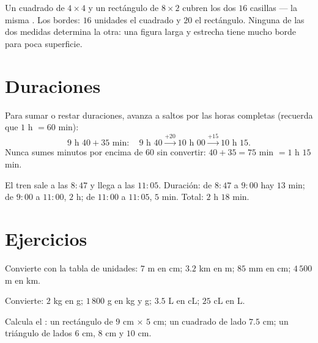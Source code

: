 \begin{example}\label{ex:g4:measure:samearea}
Un cuadrado de $4 \times 4$ y un rectángulo de $8 \times 2$ cubren los dos $16$
casillas --- la misma . Los bordes: $16$ unidades el cuadrado y $20$ el
rectángulo. Ninguna de las dos medidas determina la otra: una figura larga y estrecha
tiene mucho borde para poca superficie.
\end{example}

\section{Duraciones}

\begin{method}\label{met:g4:measure:time}
Para sumar o restar duraciones, avanza a saltos por las horas completas
(recuerda que $1$ h $= 60$ min):
\[
9\text{ h }40 + 35 \text{ min}:
\quad 9\text{ h }40 \xrightarrow{+20} 10\text{ h }00
\xrightarrow{+15} 10\text{ h }15 .
\]
Nunca sumes minutos por encima de $60$ sin convertir: $40 + 35 = 75$ min
$= 1$ h $15$ min.
\end{method}

\begin{example}\label{ex:g4:measure:timetable}
El tren sale a las $8{:}47$ y llega a las $11{:}05$. Duración:
de $8{:}47$ a $9{:}00$ hay $13$ min; de $9{:}00$ a $11{:}00$, $2$ h;
de $11{:}00$ a $11{:}05$, $5$ min. Total: $2$ h $18$ min.
\end{example}

\section{Ejercicios}

\begin{exercise}[$\star$]\label{exo:g4:measure:1}
Convierte con la tabla de unidades: $7$ m en cm; $3.2$ km en m; $85$ mm en
cm; $4\,500$ m en km.
\end{exercise}

\begin{exercise}[$\star$]\label{exo:g4:measure:2}
Convierte: $2$ kg en g; $1\,800$ g en kg y g; $3.5$ L en cL;
$25$ cL en L.
\end{exercise}

\begin{exercise}[$\star$]\label{exo:g4:measure:3}
Calcula el : un rectángulo de $9$ cm $\times$ $5$ cm; un cuadrado
de lado $7.5$ cm; un triángulo de lados $6$ cm, $8$ cm y $10$ cm.
\end{exercise}

